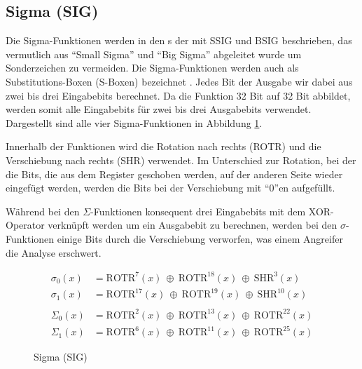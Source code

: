 \subsection{Sigma (SIG)}
Die Sigma-Funktionen werden in den s der  mit SSIG und BSIG beschrieben, das vermutlich aus "`Small Sigma"' und "`Big Sigma"' abgeleitet wurde
um Sonderzeichen zu vermeiden. Die Sigma-Funktionen werden auch als Substitutions-Boxen (S-Boxen) bezeichnet \cite[1]{sha256analyse}. Jedes Bit der Ausgabe wir dabei
aus zwei bis drei Eingabebits berechnet. Da die Funktion 32 Bit auf 32 Bit abbildet, werden somit alle Eingabebits für zwei bis drei Ausgabebits verwendet.
Dargestellt sind alle vier Sigma-Funktionen in Abbildung \ref{eq:sig}.

Innerhalb der Funktionen wird die Rotation nach rechts (ROTR) und die Verschiebung nach rechts (SHR) verwendet. Im Unterschied zur Rotation, bei der die Bits,
die aus dem Register geschoben werden, auf der anderen Seite wieder eingefügt werden, werden die Bits bei der Verschiebung mit "`$0$"'en aufgefüllt.

Während bei den $\Sigma$-Funktionen konsequent drei Eingabebits mit dem XOR-Operator verknüpft werden um ein Ausgabebit zu berechnen, werden bei den $\sigma$-Funktionen
einige Bits durch die Verschiebung verworfen, was einem Angreifer die Analyse erschwert.

\begin{figure}[!h]
  \begin{align}
  \sigma_0(x) &= \text{ROTR}^{7}(x)~\oplus~\text{ROTR}^{18}(x)~\oplus~\text{SHR}^{3}(x) \nonumber\\
  \sigma_1(x) &= \text{ROTR}^{17}(x)~\oplus~\text{ROTR}^{19}(x)~\oplus~\text{SHR}^{10}(x) \nonumber\\
  \nonumber\\
  \Sigma_0(x) &= \text{ROTR}^{2}(x)~\oplus~\text{ROTR}^{13}(x)~\oplus~\text{ROTR}^{22}(x) \nonumber\\
  \Sigma_1(x) &= \text{ROTR}^{6}(x)~\oplus~\text{ROTR}^{11}(x)~\oplus~\text{ROTR}^{25}(x) \nonumber
  \end{align}
  \caption{Sigma (SIG)}
  \label{eq:sig}
\end{figure}
